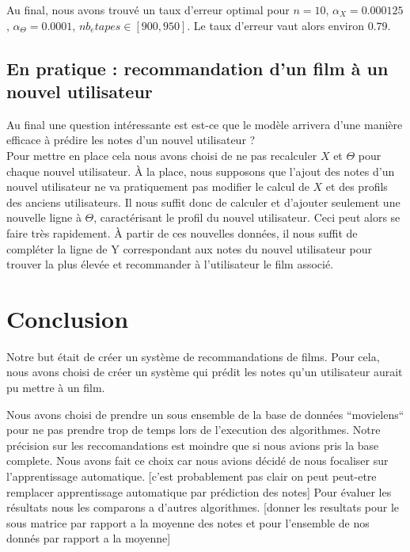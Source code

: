 \documentclass[a4paper,10pt]{article}
\begin{document}
Au final, nous avons trouvé un taux d'erreur optimal pour $n = 10$, $\alpha_X = 0.000125$, $\alpha_\Theta = 0.0001$, $nb_etapes \in [900,950]$. Le taux d'erreur vaut alors environ $0.79$.


\subsection{En pratique : recommandation d'un film à un nouvel utilisateur}

Au final une question intéressante est est-ce que le modèle arrivera d'une manière efficace à prédire les notes d'un nouvel utilisateur ?\\

Pour mettre en place cela nous avons choisi de ne pas recalculer $X$ et $\Theta$ pour chaque nouvel utilisateur. À la place, nous supposons que l'ajout des notes d'un nouvel utilisateur ne va pratiquement pas modifier le calcul de $X$ et des profils des anciens utilisateurs. Il nous suffit donc de calculer et d'ajouter seulement une nouvelle ligne à $\Theta$, caractérisant le profil du nouvel utilisateur. Ceci peut alors se faire très rapidement. À partir de ces nouvelles données, il nous suffit de compléter la ligne de Y correspondant aux notes du nouvel utilisateur pour trouver la plus élevée et recommander à l'utilisateur le film associé.

\section*{Conclusion}

Notre but était de créer un système de recommandations de films. Pour cela, nous avons choisi de créer un système qui prédit les notes qu'un utilisateur aurait pu mettre à un film. 

Nous avons %
choisi de prendre un sous ensemble de la base de données ``movielens``
pour ne pas prendre trop de temps lors de l'execution des algorithmes. %
Notre précision sur les reccomandations est moindre que si nous avions pris la
base complete. Nous avons fait ce choix car nous avions décidé de nous 
focaliser sur l'apprentissage automatique. [c'est probablement pas clair on peut peut-etre remplacer apprentissage automatique par prédiction des notes]
Pour évaluer les résultats nous les comparons a d'autres algorithmes.
[donner les resultats pour le sous matrice par rapport a la moyenne des notes et pour l'ensemble de nos donnés par rapport a la moyenne]%
\end{document}
